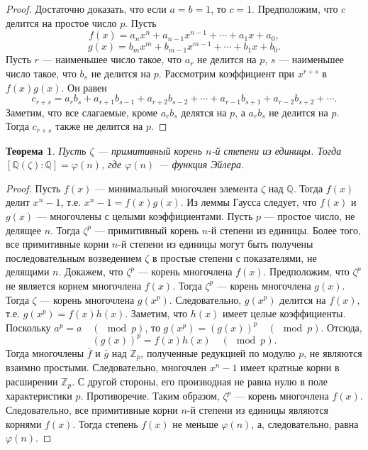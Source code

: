 \documentclass[12pt, titlepage, oneside]{amsbook}
\newcommand{\ZZ}{\mathbb{Z}}
\newcommand{\QQ}{\mathbb{Q}}
\newtheorem{theorem}{Теорема}[chapter]
\theoremstyle{definition}
\theoremstyle{remark}
\begin{document}
\begin{proof}
Достаточно доказать, что если $a=b=1$, то $c=1$. Предположим, что $c$ делится на простое число $p$. Пусть $$f(x)=a_n x^n+ a_{n-1}x^{n-1}+\cdots+a_1 x+ a_0,$$ $$g(x)=b_m x^m+ b_{m-1}x^{m-1}+\cdots+b_1 x+ b_0.$$ Пусть $r$ --- наименьшее число такое, что $a_r$ не делится на $p$, $s$ --- наименьшее число такое, что $b_s$ не делится на $p$. Рассмотрим коэффициент при $x^{r+s}$ в $f(x)g(x)$. Он равен $$c_{r+s}=a_rb_s+a_{r+1}b_{s-1}+a_{r+2}b_{s-2}+\cdots+a_{r-1}b_{s+1}+a_{r-2}b_{s+2}+\cdots.$$ Заметим, что все слагаемые, кроме $a_rb_s$ делятся на $p$, а $a_rb_s$ не делится на $p$. Тогда $c_{r+s}$ также не делится на $p$.
\end{proof}

\begin{theorem}
\label{Edin1}
Пусть $\zeta$ --- примитивный корень $n$-й степени из единицы. Тогда $[\QQ(\zeta):\QQ]=\varphi(n)$, где $\varphi(n)$ --- функция Эйлера.
\end{theorem}

\begin{proof}
Пусть $f(x)$ --- минимальный многочлен элемента $\zeta$ над $\QQ$. Тогда $f(x)$ делит $x^n-1$, т.е. $x^n-1=f(x)g(x)$. Из леммы Гаусса следует, что $f(x)$ и $g(x)$ --- многочлены с целыми коэффициентами. Пусть $p$ --- простое число, не делящее $n$. Тогда $\zeta^p$ --- примитивный корень $n$-й степени из единицы. Более того, все примитивные корни $n$-й степени из единицы могут быть получены последовательным возведением $\zeta$ в простые степени с показателями, не делящими $n$. Докажем, что $\zeta^p$ --- корень многочлена $f(x)$. Предположим, что $\zeta^p$ не является корнем многочлена $f(x)$. Тогда $\zeta^p$ --- корень многочлена $g(x)$. Тогда $\zeta$ --- корень многочлена $g(x^p)$. Следовательно, $g(x^p)$ делится на $f(x)$, т.е. $g(x^p)=f(x)h(x)$. Заметим, что $h(x)$ имеет целые коэффициенты. Поскольку $a^p=a\quad(\mod p)$, то $g(x^p)=(g(x))^p \quad(\mod p)$. Отсюда, $$(g(x))^p=f(x)h(x)\quad(\mod p).$$ Тогда многочлены $\bar{f}$ и $\bar{g}$ над $\ZZ_p$, полученные редукцией по модулю $p$, не являются взаимно простыми. Следовательно, многочлен $x^n-1$ имеет кратные корни в расширении $\ZZ_p$. С другой стороны, его производная не равна нулю в поле характеристики $p$. Противоречие. Таким образом, $\zeta^p$ --- корень многочлена $f(x)$. Следовательно, все примитивные корни $n$-й степени из единицы являются корнями $f(x)$. Тогда степень $f(x)$ не меньше $\varphi(n)$, а, следовательно, равна $\varphi(n)$.
\end{proof}
\end{document}
